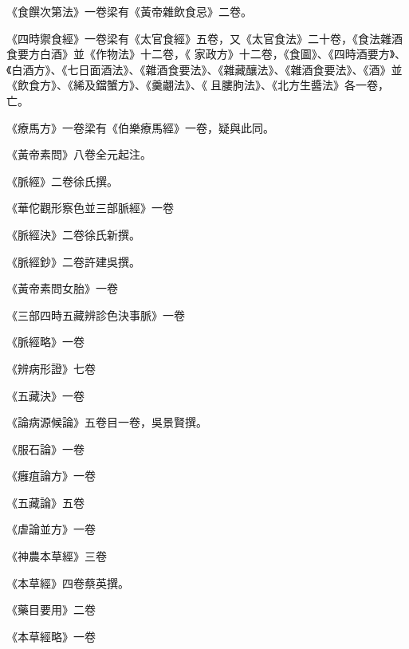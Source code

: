 \begin{pinyinscope}
 《食饌次第法》一卷梁有《黃帝雜飲食忌》二卷。



 《四時禦食經》一卷梁有《太官食經》五卷，又《太官食法》二十卷，《食法雜酒食要方白酒》並《作物法》十二卷，《
 家政方》十二卷，《食圖》、《四時酒要方》、《白酒方》、《七日面酒法》、《雜酒食要法》、《雜藏釀法》、《雜酒食要法》、《酒》並《飲食方》、《絺及鐺蟹方》、《羹翽法》、《且膢朐法》、《北方生醬法》各一卷，亡。



 《療馬方》一卷梁有《伯樂療馬經》一卷，疑與此同。



 《黃帝素問》八卷全元起注。



 《脈經》二卷徐氏撰。



 《華佗觀形察色並三部脈經》一卷



 《脈經決》二卷徐氏新撰。



 《脈經鈔》二卷許建吳撰。



 《黃帝素問女胎》一卷



 《三部四時五藏辨診色決事脈》一卷



 《脈經略》一卷



 《辨病形證》七卷



 《五藏決》一卷



 《論病源候論》五卷目一卷，吳景賢撰。



 《服石論》一卷



 《癰疽論方》一卷



 《五藏論》五卷



 《虐論並方》一卷



 《神農本草經》三卷



 《本草經》四卷蔡英撰。



 《藥目要用》二卷



 《本草經略》一卷




\end{pinyinscope}
